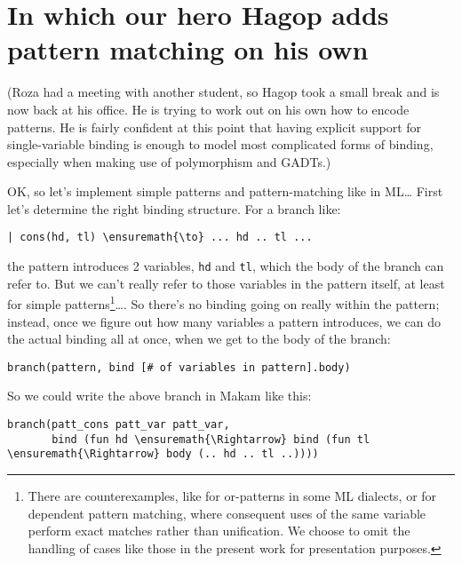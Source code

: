 \section{In which our hero Hagop adds pattern matching on his
own}\label{in-which-our-hero-hagop-adds-pattern-matching-on-his-own}

\begin{scenecomment}
(Roza had a meeting with another student, so Hagop took a small break and is now back at his
office. He is trying to work out on his own how to encode patterns. He is fairly
confident at this point that having explicit support for single-variable
binding is enough to model most complicated forms of binding, especially when making use of
polymorphism and GADTs.)
\end{scenecomment}

\identNormal
\heroSTUDENT{} OK, so let's implement simple patterns and pattern-matching
like in ML\ldots{} First let's determine the right binding structure.
For a branch like:

\begin{verbatim}
| cons(hd, tl) \ensuremath{\to} ... hd .. tl ...
\end{verbatim}

the pattern introduces 2 variables, \texttt{hd} and \texttt{tl}, which
the body of the branch can refer to. But we can't really refer to those
variables in the pattern itself, at least for simple
patterns\footnote{There are counterexamples, like for or-patterns in some ML dialects, or for dependent pattern matching, where consequent uses of the same variable perform exact matches rather than unification. We choose to omit the handling of cases like those in the present work for presentation purposes.}\ldots{}.
So there's no binding going on really within the pattern; instead, once
we figure out how many variables a pattern introduces, we can do the
actual binding all at once, when we get to the body of the branch:

\begin{verbatim}
branch(pattern, bind [# of variables in pattern].body)
\end{verbatim}

So we could write the above branch in Makam like this:

\begin{verbatim}
branch(patt_cons patt_var patt_var,
       bind (fun hd \ensuremath{\Rightarrow} bind (fun tl \ensuremath{\Rightarrow} body (.. hd .. tl ..))))
\end{verbatim}

